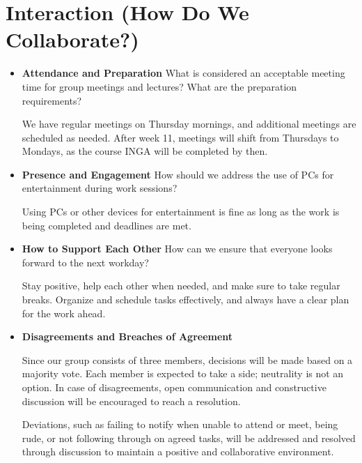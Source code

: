 \section*{Interaction (How Do We Collaborate?)}
\begin{itemize}
    \setlength{\itemsep}{10pt} %
    \item \textbf{Attendance and Preparation}  
    What is considered an acceptable meeting time for group meetings and lectures? What are the preparation requirements?

    We have regular meetings on Thursday mornings, and additional meetings are scheduled as needed. After week 11, meetings will shift from Thursdays to Mondays, as the course INGA will be completed by then.

    \item \textbf{Presence and Engagement}  
    How should we address the use of PCs for entertainment during work sessions?

    Using PCs or other devices for entertainment is fine as long as the work is being completed and deadlines are met.

    \item \textbf{How to Support Each Other}  
    How can we ensure that everyone looks forward to the next workday?

    Stay positive, help each other when needed, and make sure to take regular breaks. Organize and schedule tasks effectively, and always have a clear plan for the work ahead.

    \item \textbf{Disagreements and Breaches of Agreement}  


    Since our group consists of three members, decisions will be made based on a majority vote. Each member is expected to take a side; neutrality is not an option. In case of disagreements, open communication and constructive discussion will be encouraged to reach a resolution. 

    Deviations, such as failing to notify when unable to attend or meet, being rude, or not following through on agreed tasks, will be addressed and resolved through discussion to maintain a positive and collaborative environment.
    
\end{itemize}
